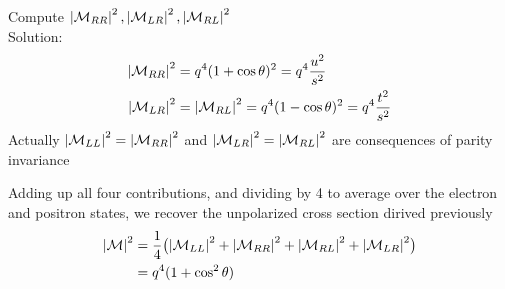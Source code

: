 \documentclass[TheoreticalPhy_ModB.tex]{subfiles}
\begin{document}
\begin{exercise}
Compute $\left\lvert \mathcal{M}_{RR} \right\rvert^2, \left\lvert \mathcal{M}_{LR} \right\rvert^2, \left\lvert \mathcal{M}_{RL} \right\rvert^2$\\
Solution:
\[
\begin{split}
\left\lvert \mathcal{M}_{RR} \right\rvert^2 	& = q^4 (1 + \cos \theta)^2 = q^4 \frac{u^2}{s^2} \\
\left\lvert \mathcal{M}_{LR} \right\rvert^2	& = \left\lvert \mathcal{M}_{RL} \right\rvert^2 = q^4(1 - \cos \theta)^2 = q^4 \frac{t^2}{s^2}
\end{split}
\]
Actually $\left\lvert \mathcal{M}_{LL} \right\rvert^2 = \left\lvert \mathcal{M}_{RR} \right\rvert^2$ and $\left\lvert \mathcal{M}_{LR} \right\rvert^2 = \left\lvert \mathcal{M}_{RL} \right\rvert^2$ are consequences of parity invariance
\end{exercise}
Adding up all four contributions, and dividing by 4 to average over the electron and positron states, we recover the unpolarized cross section dirived previously
\[
\begin{split}
\left\lvert \mathcal{M} \right\rvert^2 	& = \frac{1}{4} \bigl( \left\lvert \mathcal{M}_{LL} \right\rvert^2 + \left\lvert \mathcal{M}_{RR} \right\rvert^2 
	+ \left\lvert \mathcal{M}_{RL} \right\rvert^2 + \left\lvert \mathcal{M}_{LR} \right\rvert^2 \bigr) \\
				& = q^4(1 + \cos^2 \theta)
\end{split}
\]
\end{document}
